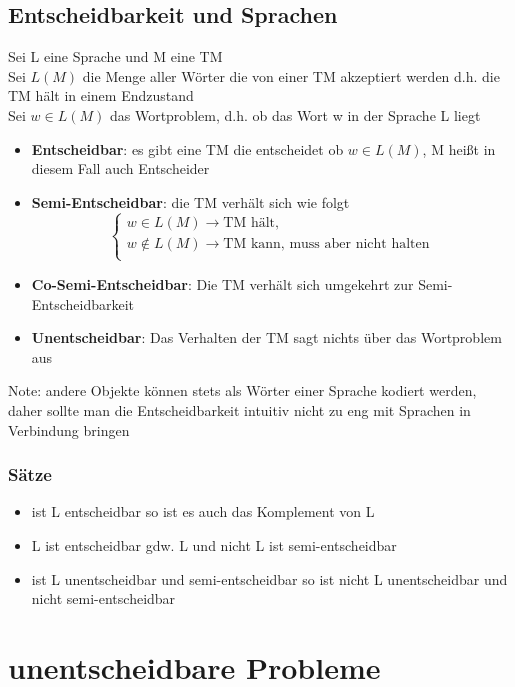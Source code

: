 \documentclass[12pt,a4paper]{article}
\begin{document}
\subsection{Entscheidbarkeit und Sprachen}
Sei L eine Sprache und M eine TM\\
Sei $L(M)$ die Menge aller Wörter die von einer TM akzeptiert werden d.h. die TM hält in einem Endzustand\\
Sei $w \in L(M)$ das Wortproblem, d.h. ob das Wort w in der Sprache L liegt

\begin{itemize}
\item \textbf{Entscheidbar}: es gibt eine TM die entscheidet ob $w \in L(M)$, M heißt in diesem Fall auch Entscheider
\item \textbf{Semi-Entscheidbar}: die TM verhält sich wie folgt $$
\begin{cases}
w\in L(M) \rightarrow \text{TM hält},\\
w \not\in L(M) \rightarrow \text{TM kann, muss aber nicht halten}\\
\end{cases}
$$
\item \textbf{Co-Semi-Entscheidbar}: Die TM verhält sich umgekehrt zur Semi-Entscheidbarkeit
\item \textbf{Unentscheidbar}: Das Verhalten der TM sagt nichts über das Wortproblem aus
\end{itemize}
Note: andere Objekte können stets als Wörter einer Sprache kodiert werden, daher sollte man die Entscheidbarkeit intuitiv nicht zu eng mit Sprachen in Verbindung bringen
\subsubsection{Sätze}
\begin{itemize}
\item ist L entscheidbar so ist es auch das Komplement von L
\item L ist entscheidbar gdw. L und nicht L ist semi-entscheidbar
\item ist L unentscheidbar und semi-entscheidbar so ist nicht L unentscheidbar und nicht semi-entscheidbar
\end{itemize}

\section{unentscheidbare Probleme}
\end{document}

